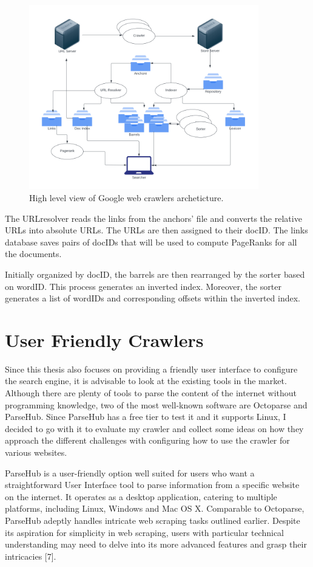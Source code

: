 \begin{figure}[h]	
     \centering
     \includegraphics[width=10cm]{images/google_arch.png}
     \caption{High level view of Google web crawlers archeticture.}
     \label{fig:google-arch}
\end{figure}

The URLresolver reads the links from the anchors' file and converts the relative URLs into absolute URLs. The URLs are then assigned to their docID. The links database saves pairs of docIDs that will be used to compute PageRanks for all the documents. 

Initially organized by docID, the barrels are then rearranged by the sorter based on wordID. This process generates an inverted index. Moreover, the sorter generates a list of wordIDs and corresponding offsets within the inverted index. 

\section{User Friendly Crawlers}
Since this thesis also focuses on providing a friendly user interface to configure the search engine, it is advisable to look at the existing tools in the market. Although there are plenty of tools to parse the content of the internet without programming knowledge, two of the most well-known software are Octoparse and ParseHub. Since ParseHub has a free tier to test it and it supports Linux, I decided to go with it to evaluate my crawler and collect some ideas on how they approach the different challenges with configuring how to use the crawler for various websites. 

ParseHub is a user-friendly option well suited for users who want a straightforward User Interface tool to parse information from a specific website on the internet. It operates as a desktop application, catering to multiple platforms, including Linux, Windows and Mac OS X. Comparable to Octoparse, ParseHub adeptly handles intricate web scraping tasks outlined earlier. Despite its aspiration for simplicity in web scraping, users with particular technical understanding may need to delve into its more advanced features and grasp their intricacies [7].



